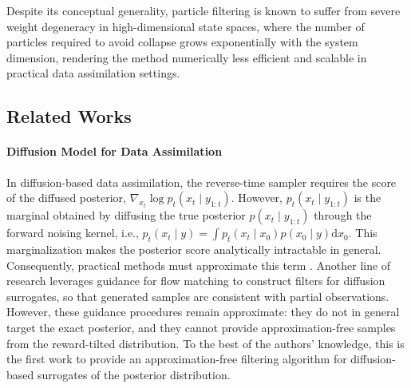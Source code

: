 \documentclass{article}
\newcommand{\dif}{{\mathrm{d}}}
\theoremstyle{plain}
\theoremstyle{definition}
\theoremstyle{remark}
\begin{document}
Despite its conceptual generality, particle filtering is known to suffer from
severe weight degeneracy in high-dimensional state spaces, where the number of particles required to avoid collapse grows exponentially with the system
dimension, rendering the method numerically less efficient and scalable in practical data assimilation settings.

\vspace{-0.1in}

\subsection{Related Works}

\paragraph{Diffusion Model for Data Assimilation}

In diffusion-based data assimilation, the reverse-time sampler requires the score of the diffused posterior,
$\nabla_{x_t}\log p_t(x_t\mid y_{1:t})$.
However, $p_t(x_t\mid y_{1:t})$ is the marginal obtained by diffusing the true posterior $p(x_t\mid y_{1:t})$ through the forward noising kernel, i.e., $p_t(x_t\mid y)=\int p_t(x_t\mid x_0)p(x_0\mid y)\dif x_0 .$ This marginalization makes the posterior score analytically intractable in general. Consequently, practical methods must approximate this term \cite{rozet2023score,bao2023score,hodyss2025using}.  Another line of research leverages guidance for flow matching \cite{chen2025flowdas,transue2025flow,bao2025ensemble} to construct filters for diffusion surrogates, so that generated samples are consistent with partial observations. However, these guidance procedures remain approximate: they do not in general target the exact posterior, and they cannot provide approximation-free samples from the reward-tilted distribution. To the best of the authors' knowledge, this is the first work to provide an approximation-free filtering algorithm for diffusion-based surrogates of the posterior distribution.





\vspace{-0.1in}
\end{document}
